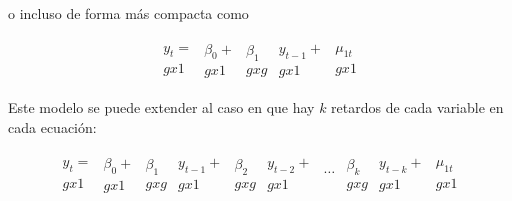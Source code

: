 		o incluso de forma m\'as compacta como
		
		\begin{gather}
		\begin{matrix} y_{t} =       \\ g x 1 \end{matrix}
		\begin{matrix} \beta_{0} +\\ g x 1 \end{matrix}
		\begin{matrix} \beta_{1}   \\ g x g \end{matrix}
		\begin{matrix} y_{t-1} +    \\ g x 1 \end{matrix}
		\begin{matrix} \mu_{1t}    \\ g x 1 \end{matrix}
		\end{gather}
		
		Este modelo se puede extender al caso en que hay $k$ retardos de cada variable en cada ecuaci\'on:
		
		\begin{gather}
		\begin{matrix} y_{t} =       \\ g x 1 \end{matrix}
		\begin{matrix} \beta_{0} +\\ g x 1 \end{matrix}
		\begin{matrix} \beta_{1}   \\ g x g \end{matrix}
		\begin{matrix} y_{t-1} +    \\ g x 1 \end{matrix}
		\begin{matrix} \beta_{2}   \\ g x g \end{matrix}
		\begin{matrix} y_{t-2} +    \\ g x 1 \end{matrix}
		\begin{matrix} \dots{}    \\  \end{matrix}
		\begin{matrix} \beta_{k}   \\ g x g \end{matrix}
		\begin{matrix} y_{t-k} +    \\ g x 1 \end{matrix}
		\begin{matrix} \mu_{1t}    \\ g x 1 \end{matrix}
		\end{gather}
		
